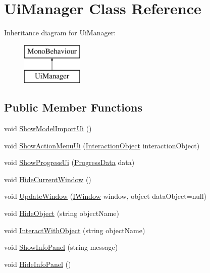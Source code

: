\hypertarget{class_ui_manager}{}\section{Ui\+Manager Class Reference}
\label{class_ui_manager}
Inheritance diagram for Ui\+Manager\+:\begin{figure}[H]
\begin{center}
\leavevmode
\includegraphics[height=2.000000cm]{class_ui_manager}
\end{center}
\end{figure}
\subsection*{Public Member Functions}
\begin{DoxyCompactItemize}
\item 
void \mbox{\hyperlink{class_ui_manager_a7e7d498b91dafeec3e17f437f8b21476}{Show\+Model\+Import\+Ui}} ()
\item 
void \mbox{\hyperlink{class_ui_manager_aad8d3c4e5861408df38ba876342b7462}{Show\+Action\+Menu\+Ui}} (\mbox{\hyperlink{class_interaction_object}{Interaction\+Object}} interaction\+Object)
\item 
void \mbox{\hyperlink{class_ui_manager_a8d0a41cbac769245cfec85bdbfea7016}{Show\+Progress\+Ui}} (\mbox{\hyperlink{class_progress_data}{Progress\+Data}} data)
\item 
void \mbox{\hyperlink{class_ui_manager_a55a912344d1a6881b8107492ea3483a1}{Hide\+Current\+Window}} ()
\item 
void \mbox{\hyperlink{class_ui_manager_a5299b0432a8a19d7c98dca26506d7519}{Update\+Window}} (\mbox{\hyperlink{interface_i_window}{I\+Window}} window, object data\+Object=null)
\item 
void \mbox{\hyperlink{class_ui_manager_a1cb78e3a47e10b031ce57afb314ca325}{Hide\+Object}} (string object\+Name)
\item 
void \mbox{\hyperlink{class_ui_manager_a29bd6700b20d98d699f5fc7623460a3d}{Interact\+With\+Object}} (string object\+Name)
\item 
void \mbox{\hyperlink{class_ui_manager_a258d350817ef4c325ac86d93f3bc12d8}{Show\+Info\+Panel}} (string message)
\item 
void \mbox{\hyperlink{class_ui_manager_ad25d66056dc6d01b980834273ed41858}{Hide\+Info\+Panel}} ()
\end{DoxyCompactItemize}
